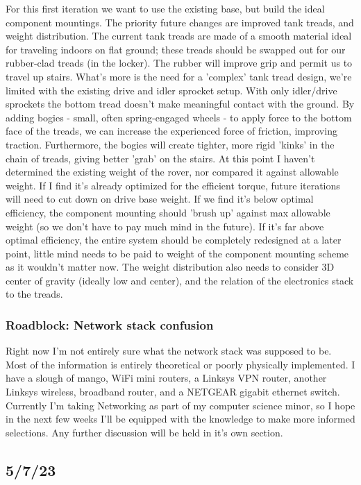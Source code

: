 \documentclass[a4paper, 10pt]{article}
\begin{document}
		For this first iteration we want to use the existing base, but build the ideal component mountings. The priority future changes are improved tank treads, and weight distribution. The current tank treads are made of a smooth material ideal for traveling indoors on flat ground; these treads should be swapped out for our rubber-clad treads (in the locker). The rubber will improve grip and permit us to travel up stairs. What's more is the need for a 'complex' tank tread design, we're limited with the existing drive and idler sprocket setup. With only idler/drive sprockets the bottom tread doesn't make meaningful contact with the ground. By adding bogies - small, often spring-engaged wheels - to apply force to the bottom face of the treads, we can increase the experienced force of friction, improving traction. Furthermore, the bogies will create tighter, more rigid 'kinks' in the chain of treads, giving better 'grab' on the stairs. At this point I haven't determined the existing weight of the rover, nor compared it against allowable weight. If I find it's already optimized for the efficient torque, future iterations will need to cut down on drive base weight. If we find it's below optimal efficiency, the component mounting should 'brush up' against max allowable weight (so we don't have to pay much mind in the future). If it's far above optimal efficiency, the entire system should be completely redesigned at a later point, little mind needs to be paid to weight of the component mounting scheme as it wouldn't matter now. The weight distribution also needs to consider 3D center of gravity (ideally low and center), and the relation of the electronics stack to the treads. 
		
		\subsubsection{Roadblock: Network stack confusion}
		Right now I'm not entirely sure what the network stack was supposed to be. Most of the information is entirely theoretical or poorly physically implemented. I have a slough of mango, WiFi mini routers, a Linksys VPN router, another Linksys wireless, broadband router, and a NETGEAR gigabit ethernet switch. Currently I'm taking Networking as part of my computer science minor, so I hope in the next few weeks I'll be equipped with the knowledge to make more informed selections. Any further discussion will be held in it's own section.	
		
		
	\subsection{5/7/23}
\end{document}
